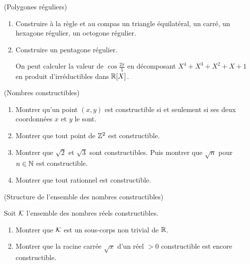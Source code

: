 \documentclass[a4paper,11pt,reqno]{amsart}
\begin{document}
\begin{exo}  (Polygones réguliers)

  \begin{enumerate}
    \item Construire à la règle et au compas un triangle équilatéral, un carré, un hexagone régulier, un octogone régulier.
    \item Construire un pentagone régulier.\\
    \begin{indication}
      On peut calculer la valeur de $\cos \frac{2\pi}{5}$ en décomposant $X^4+X^3+X^2+X+1$ en produit d'irréductibles dans $\mathbb{R}[X]$.
    \end{indication}
  \end{enumerate}
\end{exo}


\begin{exo} (Nombres constructibles)

  \begin{enumerate}
    \item Montrer qu'un point $(x,y)$ est constructible si et seulement si ses deux coordonnées $x$ et $y$ le sont.
    \item Montrer que tout point de $\mathbb{Z}^2$ est constructible.
    \item Montrer que $\sqrt{2}$ et $\sqrt{3}$ sont constructibles. Puis montrer que $\sqrt{n}$ pour $n \in \mathbb{N}$ est constructible.
    \item Montrer que tout rationnel est constructible.
  \end{enumerate}
\end{exo}


\begin{exo}  (Structure de l'ensemble des nombres constructibles)

  Soit $\mathcal K$ l'ensemble  des nombres réels constructibles.
  \begin{enumerate}
    \item Montrer que $\mathcal K$ est un sous-corps non trivial de $\mathbb{R}$.
    \item Montrer que la racine carrée $\sqrt{x}$ d'un réel $>0$ constructible est encore constructible.
  \end{enumerate}
\end{exo}
\end{document}
